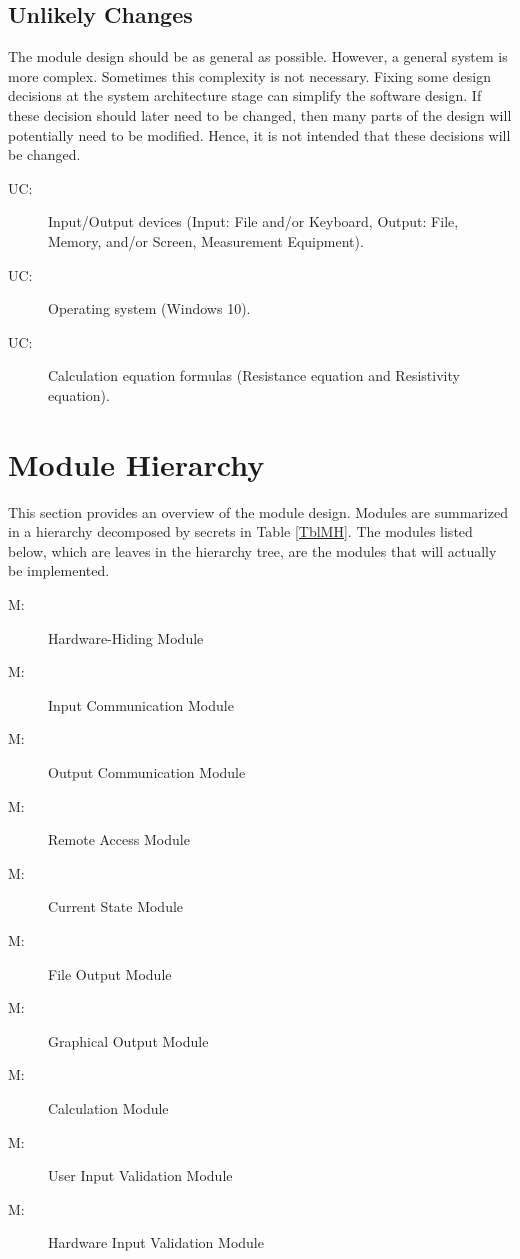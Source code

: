 \documentclass[12pt, titlepage]{article}
\newcounter{ucnum}
\newcommand{\uctheucnum}{UC\theucnum}
\newcounter{mnum}
\newcommand{\mthemnum}{M\themnum}
\begin{document}
\subsection{Unlikely Changes} \label{SecUchange}

The module design should be as general as possible. However, a general system is
more complex. Sometimes this complexity is not necessary. Fixing some design
decisions at the system architecture stage can simplify the software design. If
these decision should later need to be changed, then many parts of the design
will potentially need to be modified. Hence, it is not intended that these
decisions will be changed.

\begin{description}
\item[ \uctheucnum \label{ucIO}:] Input/Output devices
  (Input: File and/or Keyboard, Output: File, Memory, and/or Screen, Measurement Equipment).
\item[ \uctheucnum \label{ucOS}:] Operating system (Windows 10).
\item[ \uctheucnum \label{ucCalculation}:] Calculation equation formulas (Resistance equation and Resistivity equation).
\end{description}

\section{Module Hierarchy} \label{SecMH}

This section provides an overview of the module design. Modules are summarized
in a hierarchy decomposed by secrets in Table \ref{TblMH}. The modules listed
below, which are leaves in the hierarchy tree, are the modules that will
actually be implemented.

\begin{description}
\item [ \mthemnum \label{mHH}:] Hardware-Hiding Module
\item [ \mthemnum \label{mIC}:] Input Communication Module
\item [ \mthemnum \label{mOC}:] Output Communication Module
\item [ \mthemnum \label{mRA}:] Remote Access Module
\item [ \mthemnum \label{mCS}:] Current State Module
\item [ \mthemnum \label{mFO}:] File Output Module
\item [ \mthemnum \label{mGO}:] Graphical Output Module
\item [ \mthemnum \label{mC}:] Calculation Module
\item [ \mthemnum \label{mUI}:] User Input Validation Module
\item [ \mthemnum \label{mHI}:] Hardware Input Validation Module
\end{description}
\end{document}
